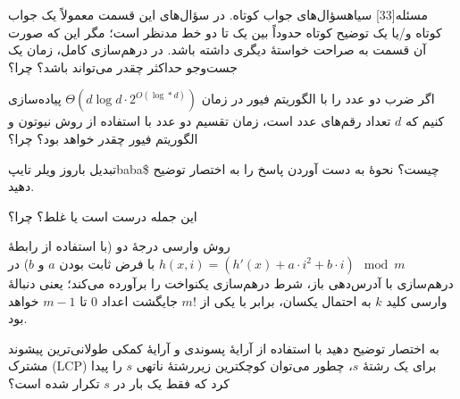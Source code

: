 ‌مسئله[33] ‌سیاه{سؤال‌های جواب کوتاه.} در سؤال‌های این قسمت معمولاً یک جواب کوتاه و/یا یک توضیح کوتاه حدوداً بین یک تا دو خط مدنظر است؛ مگر این که صورت آن قسمت به صراحت خواستۀ دیگری داشته باشد.
در درهم‌سازی کامل، زمان یک جست‌وجو حداکثر چقدر می‌تواند باشد؟ چرا؟

اگر ضرب دو عدد را با الگوریتم فیور در زمان
$\Theta(d \log d\cdot2^{O(\log*d)})$
 پیاده‌سازی کنیم که $d$ تعداد رقم‌های عدد است، زمان تقسیم دو عدد با استفاده از روش نیوتون و الگوریتم فیور چقدر خواهد بود؟ چرا؟

تبدیل باروز ویلر ‌تایپ{baba\$} چیست؟ نحوۀ به دست آوردن پاسخ را به اختصار توضیح دهید. 


این جمله درست است یا غلط؟ چرا؟

روش وارسی درجۀ دو
(با استفاده از رابطۀ $h(x,i)=(h'(x) + a\cdot i^2+b\cdot i) \mod m$ با فرض ثابت بودن $a$ و $b$) 
در درهم‌سازی با آدرس‌دهی باز، شرط درهم‌سازی یکنواخت را برآورده می‌کند؛ یعنی دنبالۀ وارسی کلید $k$ به احتمال یکسان، برابر  با یکی از $m!$ جایگشت اعداد 0 تا $m-1$ خواهد بود.


به اختصار توضیح دهید با استفاده از آرایۀ پسوندی و آرایۀ کمکی طولانی‌ترین پیشوند مشترک (LCP) برای یک رشتۀ $s$، چطور می‌توان کوچکترین زیررشتۀ ناتهی $s$ را پیدا کرد که فقط یک بار در $s$ تکرار شده است؟

